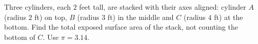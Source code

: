 Three cylinders, each $2$ feet tall, are stacked with their axes aligned: cylinder $A$ (radius $2$ ft) on top, $B$ (radius $3$ ft) in the middle and $C$ (radius $4$ ft) at the bottom. Find the total exposed surface area of the stack, not counting the bottom of $C$. Use $\pi=3.14$.
